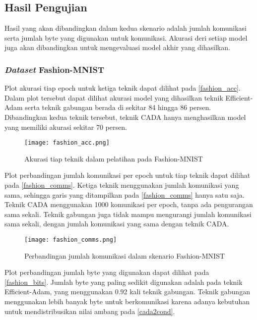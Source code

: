 \subsection{Hasil Pengujian}

Hasil yang akan dibandingkan dalam kedua skenario adalah jumlah komunikasi serta jumlah byte yang digunakan untuk komunikasi. Akurasi deri setiap model juga akan dibandingkan untuk mengevaluasi model akhir yang dihasilkan.

\subsubsection{\emph{Dataset} Fashion-MNIST}

Plot akurasi tiap epoch untuk ketiga teknik dapat dilihat pada \autoref{fashion_acc}. Dalam plot tersebut dapat dilihat akurasi model yang dihasilkan teknik Efficient-Adam serta teknik gabungan berada di sekitar 84 hingga 86 persen. Dibandingkan kedua teknik tersebut, teknik CADA hanya menghasilkan model yang memiliki akurasi sekitar 70 persen.

\begin{figure}[H]
  \centering
  \texttt{[image: fashion\_acc.png]}
  \caption{Akurasi tiap teknik dalam pelatihan pada Fashion-MNIST}\label{fashion_acc}
\end{figure}

Plot perbandingan jumlah komunikasi per epoch untuk tiap teknik dapat dilihat pada \autoref{fashion_comms}. Ketiga teknik menggunakan jumlah komunikasi yang sama, sehingga garis yang ditampilkan pada \autoref{fashion_comms} hanya satu saja. Teknik CADA menggunakan 1000 komunikasi per epoch, tanpa ada pengurangan sama sekali. Teknik gabungan juga tidak mampu mengurangi jumlah komunikasi sama sekali, dengan jumlah komunikasi yang sama dengan teknik CADA.

\begin{figure}[H]
  \centering
  \texttt{[image: fashion\_comms.png]}
  \caption{Perbandingan jumlah komunikasi dalam skenario Fashion-MNIST}\label{fashion_comms}
\end{figure}

Plot perbandingan jumlah byte yang digunakan dapat dilihat pada \autoref{fashion_bits}. Jumlah byte yang paling sedikit digunakan adalah pada teknik Efficient-Adam, yang menggunakan 0.92 kali teknik gabungan. Teknik gabungan menggunakan lebih banyak byte untuk berkomunikasi karena adanya kebutuhan untuk mendistribusikan nilai ambang pada \autoref{cada2cond}.

